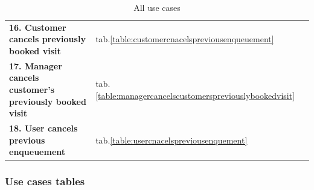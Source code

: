 \begin{table}[h!]
\begin{tabular}{@{}P{0.57\textwidth}P{0.20\textwidth}P{0.20\textwidth}@{}}
        \textbf{16. Customer cancels previously booked visit} & tab.\ref{table:customercnacelspreviousenqueuement} & \\
        \textbf{17. Manager cancels customer's previously booked visit} & tab.\ref{table:managercancelscustomerspreviouslybookedvisit} & \\
        \textbf{18. User cancels previous enqueuement} & tab.\ref{table:usercnacelspreviousenquement} & \\
        \bottomrule
    \end{tabular}
\caption{All use cases}
\label{table:usecaseindex}
\end{table}

\subsubsection{Use cases tables}

